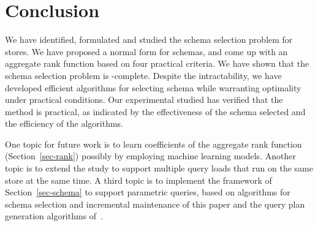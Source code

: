 \section{Conclusion}
\label{sec-conclude}
\vspace{-0.4ex}

We have identified, formulated and studied the \baav schema selection
problem for \kv stores. We have proposed a normal form for \baav schemas,
and come up with an aggregate rank function based on four practical
criteria. We have shown that the schema selection problem is
\NP-complete. Despite the intractability, we have developed
efficient algorithms for selecting \baav schema while warranting
optimality under practical conditions. Our experimental studied
has verified that the method is practical, as indicated by
the effectiveness of the \baav schema selected
and the efficiency of the algorithms.

One topic for future work is to learn coefficients of the aggregate
rank function (Section~\ref{sec-rank}) possibly by employing machine
learning models. Another topic is to extend the study to
support multiple query loads that run on the same \kv store at the same time.
A third topic is to implement the framework of Section~\ref{sec-schema}
to support parametric queries, based on algorithms for
schema selection and incremental maintenance of this paper
and the query plan generation algorithms of~\cite{VLDB19}.
